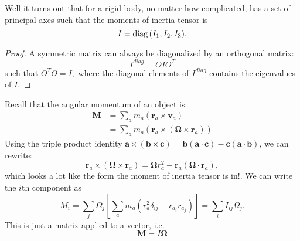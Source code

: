 \documentclass{article}
\numberwithin{equation}{section}
\begin{document}
Well it turns out that for a rigid body, no matter how complicated, has a set of principal axes such that the moments of inertia tensor is 
\begin{equation}
    I = \mathrm{diag}\,(I_1,I_2,I_3).
\end{equation}
\begin{proof}
    A symmetric matrix can always be diagonalized by an orthogonal matrix:
    \begin{equation}
        I^{diag} = OIO^T
    \end{equation}
    such that $O^TO = I,$ where the diagonal elements of $I^{diag}$ contains the eigenvalues of $I$.
\end{proof}
Recall that the angular momentum of an object is:
\begin{align*}
    \bm{M} &= \sum_a m_a(\bm{r}_a \times \bm{v}_a) \\ 
    &= \sum_a m_a(\bm{r}_a \times (\bm{\Omega} \times \bm{r}_a))
\end{align*}
Using the triple product identity $\bm{a} \times (\bm{b}\times \bm{c}) = \bm{b}(\bm{a} \cdot \bm{c}) - \bm{c}(\bm{a}\cdot\bm{b})$, we can rewrite:
\begin{equation}
    \bm{r}_a \times (\bm{\Omega} \times \bm{r}_a) = \bm{\Omega}r_a^2 - \bm{r}_a(\bm{\Omega}\cdot \bm{r}_a),
\end{equation}
which looks a lot like the form the moment of inertia tensor is in!. We can write the $i$th component as
\begin{equation}
    M_i = \sum_j \Omega_j \left[\sum_a m_a(r_a^2\delta_{ij}-r_{a_i}r_{a_j})\right] = \sum_i I_{ij}\Omega_j.
\end{equation}
This is just a matrix applied to a vector, i.e.
\begin{equation}
    \bm{M} = I\bm{\Omega}
\end{equation}
\end{document}
